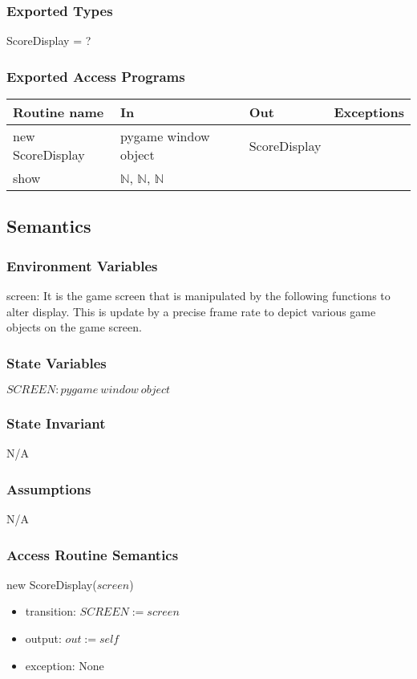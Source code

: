 \documentclass[12pt]{article}
\begin{document}
\subsubsection*{Exported Types}
ScoreDisplay = ?
\subsubsection*{Exported Access Programs}
\begin{tabular}{| l | l | l | l |}
\hline
\textbf{Routine name} & \textbf{In} & \textbf{Out} & \textbf{Exceptions}\\
\hline
new ScoreDisplay       &pygame window object&     ScoreDisplay        &           \\
\hline
show       &	$\mathbb{N}$, $\mathbb{N}$, $\mathbb{N}$     &           &          \\
\hline
\end{tabular}

\subsection*{Semantics}
\subsubsection*{Environment Variables}
screen: It is the game screen that is manipulated by the following functions to alter display. This is update by a precise frame rate to depict various game objects on the game screen.

\subsubsection*{State Variables}
$SCREEN: pygame\ window\ object$
\subsubsection*{State Invariant}
N/A
\subsubsection*{Assumptions}
N/A
\subsubsection*{Access Routine Semantics}

new ScoreDisplay($screen$)
\begin{itemize}
    \item transition: $SCREEN := screen$
    \item output: $out := self$
    \item exception: None
\end{itemize}
\end{document}
